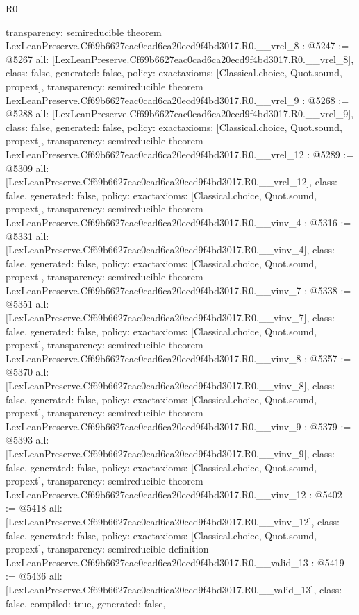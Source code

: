 \begin{lexlean}{R0}
\begin{coremodule}
{  transparency: semireducible
}
theorem LexLeanPreserve.Cf69b6627eac0cad6ca20ecd9f4bd3017.R0.__vrel_8 : @5247 := @5267 {
  all: [LexLeanPreserve.Cf69b6627eac0cad6ca20ecd9f4bd3017.R0.__vrel_8],
  class: false,
  generated: false,
  policy: exact{axioms: [Classical.choice, Quot.sound, propext]},
  transparency: semireducible
}
theorem LexLeanPreserve.Cf69b6627eac0cad6ca20ecd9f4bd3017.R0.__vrel_9 : @5268 := @5288 {
  all: [LexLeanPreserve.Cf69b6627eac0cad6ca20ecd9f4bd3017.R0.__vrel_9],
  class: false,
  generated: false,
  policy: exact{axioms: [Classical.choice, Quot.sound, propext]},
  transparency: semireducible
}
theorem LexLeanPreserve.Cf69b6627eac0cad6ca20ecd9f4bd3017.R0.__vrel_12 : @5289 := @5309 {
  all: [LexLeanPreserve.Cf69b6627eac0cad6ca20ecd9f4bd3017.R0.__vrel_12],
  class: false,
  generated: false,
  policy: exact{axioms: [Classical.choice, Quot.sound, propext]},
  transparency: semireducible
}
theorem LexLeanPreserve.Cf69b6627eac0cad6ca20ecd9f4bd3017.R0.__vinv_4 : @5316 := @5331 {
  all: [LexLeanPreserve.Cf69b6627eac0cad6ca20ecd9f4bd3017.R0.__vinv_4],
  class: false,
  generated: false,
  policy: exact{axioms: [Classical.choice, Quot.sound, propext]},
  transparency: semireducible
}
theorem LexLeanPreserve.Cf69b6627eac0cad6ca20ecd9f4bd3017.R0.__vinv_7 : @5338 := @5351 {
  all: [LexLeanPreserve.Cf69b6627eac0cad6ca20ecd9f4bd3017.R0.__vinv_7],
  class: false,
  generated: false,
  policy: exact{axioms: [Classical.choice, Quot.sound, propext]},
  transparency: semireducible
}
theorem LexLeanPreserve.Cf69b6627eac0cad6ca20ecd9f4bd3017.R0.__vinv_8 : @5357 := @5370 {
  all: [LexLeanPreserve.Cf69b6627eac0cad6ca20ecd9f4bd3017.R0.__vinv_8],
  class: false,
  generated: false,
  policy: exact{axioms: [Classical.choice, Quot.sound, propext]},
  transparency: semireducible
}
theorem LexLeanPreserve.Cf69b6627eac0cad6ca20ecd9f4bd3017.R0.__vinv_9 : @5379 := @5393 {
  all: [LexLeanPreserve.Cf69b6627eac0cad6ca20ecd9f4bd3017.R0.__vinv_9],
  class: false,
  generated: false,
  policy: exact{axioms: [Classical.choice, Quot.sound, propext]},
  transparency: semireducible
}
theorem LexLeanPreserve.Cf69b6627eac0cad6ca20ecd9f4bd3017.R0.__vinv_12 : @5402 := @5418 {
  all: [LexLeanPreserve.Cf69b6627eac0cad6ca20ecd9f4bd3017.R0.__vinv_12],
  class: false,
  generated: false,
  policy: exact{axioms: [Classical.choice, Quot.sound, propext]},
  transparency: semireducible
}
definition LexLeanPreserve.Cf69b6627eac0cad6ca20ecd9f4bd3017.R0.__valid_13 : @5419 := @5436 {
  all: [LexLeanPreserve.Cf69b6627eac0cad6ca20ecd9f4bd3017.R0.__valid_13],
  class: false,
  compiled: true,
  generated: false,
}
\end{coremodule}
\end{lexlean}
